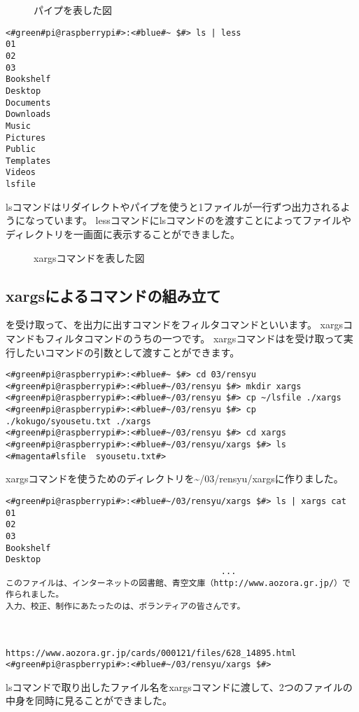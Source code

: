 \begin{figure}
    \centering
    
    \caption{パイプを表した図}
    \label{ch03:pipe}
\end{figure}


\begin{lstlisting}[caption=lsコマンドの出力をパイプでlessコマンドに渡す, label=redirectCat]
<#green#pi@raspberrypi#>:<#blue#~ $#> ls | less
01
02
03
Bookshelf
Desktop
Documents
Downloads
Music
Pictures
Public
Templates
Videos
lsfile
\end{lstlisting}

lsコマンドはリダイレクトやパイプを使うと1ファイルが一行ずつ出力されるようになっています。
lessコマンドにlsコマンドのを渡すことによってファイルやディレクトリを一画面に表示することができました。

\newpage
\begin{figure}[t]
    \centering
    
    \caption{xargsコマンドを表した図}
    \label{ch03:xargs_command}
\end{figure}

\subsection{xargsによるコマンドの組み立て}

を受け取って、を出力に出すコマンドをフィルタコマンドといいます。
xargsコマンドもフィルタコマンドのうちの一つです。
xargsコマンドはを受け取って実行したいコマンドの引数として渡すことができます。

\begin{lstlisting}[caption=xargsコマンドを使う準備をする]
<#green#pi@raspberrypi#>:<#blue#~ $#> cd 03/rensyu
<#green#pi@raspberrypi#>:<#blue#~/03/rensyu $#> mkdir xargs
<#green#pi@raspberrypi#>:<#blue#~/03/rensyu $#> cp ~/lsfile ./xargs
<#green#pi@raspberrypi#>:<#blue#~/03/rensyu $#> cp ./kokugo/syousetu.txt ./xargs
<#green#pi@raspberrypi#>:<#blue#~/03/rensyu $#> cd xargs 
<#green#pi@raspberrypi#>:<#blue#~/03/rensyu/xargs $#> ls
<#magenta#lsfile  syousetu.txt#>
\end{lstlisting}
xargsコマンドを使うためのディレクトリを\textasciitilde /03/rensyu/xargsに作りました。

\newpage
\begin{lstlisting}[caption=xargsコマンドを使ってcatコマンドを使う]
<#green#pi@raspberrypi#>:<#blue#~/03/rensyu/xargs $#> ls | xargs cat
01
02
03
Bookshelf
Desktop
                                           ...
このファイルは、インターネットの図書館、青空文庫（http://www.aozora.gr.jp/）で作られました。
入力、校正、制作にあたったのは、ボランティアの皆さんです。



https://www.aozora.gr.jp/cards/000121/files/628_14895.html
<#green#pi@raspberrypi#>:<#blue#~/03/rensyu/xargs $#>
\end{lstlisting}
lsコマンドで取り出したファイル名をxargsコマンドに渡して、2つのファイルの中身を同時に見ることができました。

